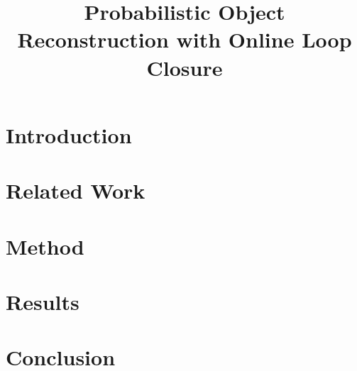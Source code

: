 \documentclass{bmvc2k}
\title{Probabilistic Object Reconstruction with Online Loop Closure}
\begin{document}
\maketitle

\begin{abstract}

\end{abstract}

\vspace{-\baselineskip}

\section{Introduction}
\label{sec:introduction}


\vspace{-\baselineskip}

\section{Related Work}
\label{sec:lit_review}


\vspace{-\baselineskip}

\section{Method}


\vspace{-\baselineskip}

\section{Results}
\label{sec:results}


\vspace{-\baselineskip}

\section{Conclusion}
\label{sec:discussion}



\end{document}
